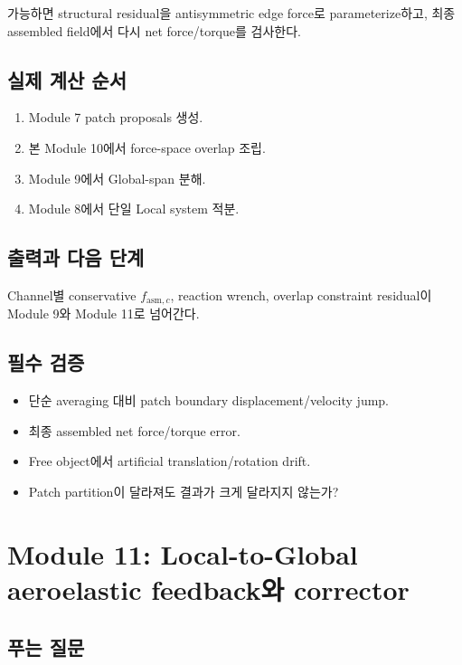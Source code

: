 \documentclass[11pt,a4paper]{article}
\begin{document}
가능하면 structural residual을 antisymmetric edge force로 parameterize하고,
최종 assembled field에서 다시 net force/torque를 검사한다.

\subsection*{실제 계산 순서}

\begin{enumerate}[leftmargin=1.7em]
  \item Module 7 patch proposals 생성.
  \item 본 Module 10에서 force-space overlap 조립.
  \item Module 9에서 Global-span 분해.
  \item Module 8에서 단일 Local system 적분.
\end{enumerate}

\subsection*{출력과 다음 단계}

Channel별 conservative \(f_{\mathrm{asm},c}\), reaction wrench,
overlap constraint residual이 Module 9와 Module 11로 넘어간다.

\subsection*{필수 검증}

\begin{itemize}[leftmargin=1.5em]
  \item 단순 averaging 대비 patch boundary displacement/velocity jump.
  \item 최종 assembled net force/torque error.
  \item Free object에서 artificial translation/rotation drift.
  \item Patch partition이 달라져도 결과가 크게 달라지지 않는가?
\end{itemize}

\section{Module 11: Local-to-Global aeroelastic feedback와 corrector}

\subsection*{푸는 질문}
\end{document}
